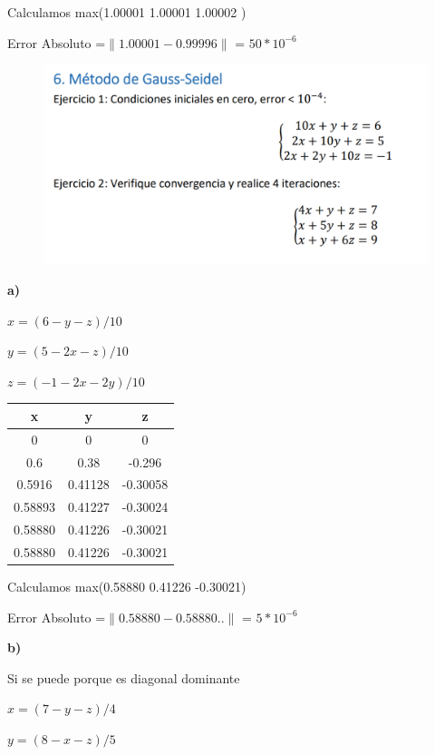 \documentclass[12pt]{article}
\begin{document}
Calculamos max(1.00001  1.00001   1.00002 )

Error Absoluto =$ \| 1.00001 - 0.99996\|$  = $50*10^{-6}$

\begin{figure}[H]
\includegraphics[width=1\textwidth]{./inFiles/Figures/Ej6.png}
\end{figure}

\textbf{a)}

$x = (6-y-z)/10$

$y = (5-2x-z)/10$

$z = (-1-2x-2y)/10$

\begin{center}
\begin{tabular}{|c|c|c|}

\hline
x & y& z\\
\hline
0    & 0    & 0   \\
0.6   & 0.38    & -0.296   \\
0.5916   & 0.41128    & -0.30058    \\
0.58893   & 0.41227    & -0.30024    \\
0.58880   & 0.41226    & -0.30021  \\
0.58880   & 0.41226     & -0.30021   \\

\hline
\end{tabular}
\end{center}

Calculamos max(0.58880  0.41226    -0.30021)

Error Absoluto =$ \| 0.58880 - 0.58880..\|$  = $5*10^{-6}$

\textbf{b)}

Si se puede porque es diagonal dominante

$x = (7-y-z)/4$

$y = (8-x-z)/5$
\end{document}

